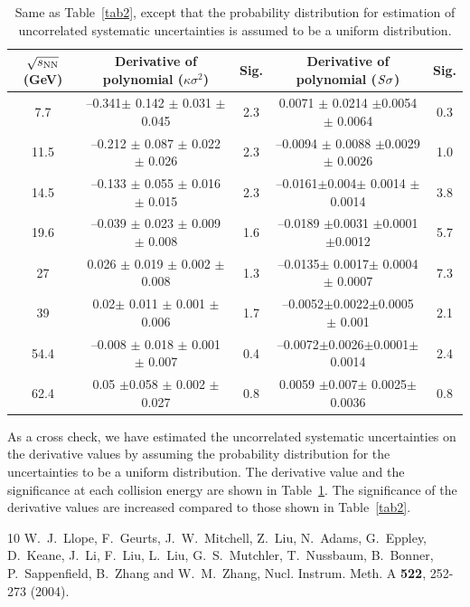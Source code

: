\documentclass[10pt,aps,prc,twocolumn,floatfix]{revtex4-1}
\newcommand{\rootsnn} {\mbox{$\sqrt{s_{\rm NN}}$}\xspace}
\begin{document}
{\begin{table}
	\caption{Same as Table~\ref{tab2}, except that the probability 
        distribution for estimation of uncorrelated systematic 
        uncertainties is assumed to be a uniform distribution.}
	\centering   
	\begin{tabular}{|c|c|c|c|c|}
		\hline	
	\rootsnn (GeV) & Derivative of polynomial ($\kappa\sigma^{2}$)&Sig.  & Derivative of polynomial ($\it{S}\sigma$)&Sig.  \\
\hline 
7.7 & --0.341$\pm$ 0.142 $\pm$ 0.031 $\pm$ 0.045  &2.3 &0.0071 $\pm$ 0.0214 $\pm$0.0054 $\pm$ 0.0064& 0.3\\
\hline 
11.5 & --0.212 $\pm$ 0.087 $\pm$ 0.022 $\pm$ 0.026 &2.3& --0.0094 $\pm$ 0.0088 $\pm$0.0029 $\pm$ 0.0026&1.0 \\
\hline 
14.5 & --0.133 $\pm$ 0.055 $\pm$ 0.016 $\pm$ 0.015 &2.3&--0.0161$\pm$0.004$\pm$  0.0014 $\pm$ 0.0014&3.8 \\
\hline 
19.6 & --0.039 $\pm$ 0.023 $\pm$ 0.009 $\pm$ 0.008 & 1.6&--0.0189 $\pm$0.0031  $\pm$0.0001 $\pm$0.0012& 5.7\\
\hline 
27 & 0.026 $\pm$ 0.019 $\pm$ 0.002 $\pm$ 0.008 & 1.3&--0.0135$\pm$ 0.0017$\pm$ 0.0004 $\pm$ 0.0007& 7.3\\
\hline 
39 & 0.02$\pm$ 0.011 $\pm$ 0.001 $\pm$ 0.006 & 1.7&--0.0052$\pm$0.0022$\pm$0.0005 $\pm$ 0.001& 2.1\\
\hline 
54.4 & --0.008 $\pm$ 0.018 $\pm$ 0.001 $\pm$ 0.007 & 0.4&--0.0072$\pm$0.0026$\pm$0.0001$\pm$ 0.0014&2.4 \\
\hline 
62.4 & 0.05 $\pm$0.058 $\pm$ 0.002  $\pm$ 0.027 &0.8 &0.0059 $\pm$0.007$\pm$ 0.0025$\pm$ 0.0036& 0.8\\
\hline 
	\end{tabular}
	\label{tab4}
\end{table}

As a cross check, we have estimated the uncorrelated systematic
uncertainties on the derivative values by assuming the probability
distribution for the uncertainties to be a uniform distribution. The
derivative value and the significance at each collision energy are shown in Table~\ref{tab4}. The significance
of the derivative values are increased compared to those shown in Table~\ref{tab2}.

\begin{thebibliography}{10}
W.~J.~Llope, F.~Geurts, J.~W.~Mitchell, Z.~Liu, N.~Adams, G.~Eppley, D.~Keane, J.~Li, F.~Liu, L.~Liu, G.~S.~Mutchler, T.~Nussbaum, B.~Bonner, P.~Sappenfield, B.~Zhang and W.~M.~Zhang,
Nucl. Instrum. Meth. A \textbf{522}, 252-273 (2004).


\end{thebibliography}}
\end{document}
